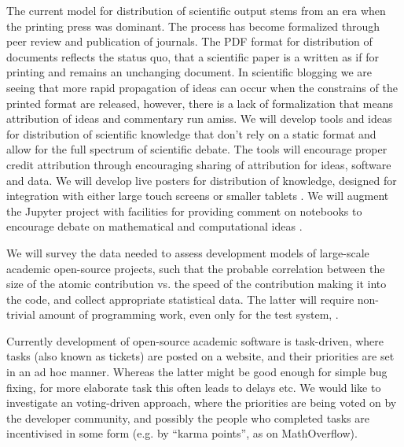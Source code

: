 \begin{workpackage}[id=social-aspects,wphases=0-48,
  title=Social Aspects,
  lead=UO,
  UORM=53,USHRM=8, USORM=6]
\begin{tasklist}
\begin{task}[title=Modern Distribution of Scientific Output]
   The current model
  for distribution of scientific output stems from an era when the
  printing press was dominant. The process has become formalized
  through peer review and publication of journals. The PDF format for
  distribution of documents reflects the status quo, that a scientific
  paper is a written as if for printing and remains an unchanging
  document. In scientific blogging we are seeing that more rapid
  propagation of ideas can occur when the constrains of the printed
  format are released, however, there is a lack of formalization that
  means attribution of ideas and commentary run amiss. We will develop
  tools and ideas for distribution of scientific knowledge that don't
  rely on a static format and allow for the full spectrum of
  scientific debate. The tools will encourage proper credit
  attribution through encouraging sharing of attribution for ideas,
  software and data. We will develop live posters for distribution of
  knowledge, designed for integration with either large touch screens
  or smaller tablets . We will augment
  the Jupyter project with facilities for providing comment on
  notebooks to encourage debate on mathematical and computational
  ideas .
\end{task}

\begin{task}[title=Survey and collection of needed data,id=datacollection]
We will survey the data needed to assess development models of
large-scale academic open-source projects, such that the probable
correlation between the size of the atomic contribution vs. the speed
of the contribution making it into the code, and collect appropriate
statistical data. The latter will require non-trivial amount of
programming work, even only for the test system, \Sage.
\end{task}

\begin{task}[title=Collective decision making in development,id=decisionmaking]
Currently development of open-source academic software is task-driven,
where tasks (also known as tickets) are posted on a website, and their
priorities are set in an ad hoc manner.  Whereas the latter might be
good enough for simple bug fixing, for more elaborate task this often
leads to delays etc.  We would like to investigate an voting-driven
approach, where the priorities are being voted on by the developer
community, and possibly the people who completed tasks are
incentivised in some form (e.g. by ``karma points'', as on
MathOverflow).
\end{task}


\end{tasklist}
\end{workpackage}
